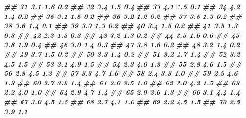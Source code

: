 \documentclass[
]{book}
\newenvironment{Shaded}{\begin{snugshade}}{\end{snugshade}}
\newcommand{\DocumentationTok}[1]{\textcolor[rgb]{0.56,0.35,0.01}{\textbf{\textit{#1}}}}
\begin{document}
\begin{Shaded}
\begin{Highlighting}[]
\DocumentationTok{\#\# 31          3.1          1.6         0.2}
\DocumentationTok{\#\# 32          3.4          1.5         0.4}
\DocumentationTok{\#\# 33          4.1          1.5         0.1}
\DocumentationTok{\#\# 34          4.2          1.4         0.2}
\DocumentationTok{\#\# 35          3.1          1.5         0.2}
\DocumentationTok{\#\# 36          3.2          1.2         0.2}
\DocumentationTok{\#\# 37          3.5          1.3         0.2}
\DocumentationTok{\#\# 38          3.6          1.4         0.1}
\DocumentationTok{\#\# 39          3.0          1.3         0.2}
\DocumentationTok{\#\# 40          3.4          1.5         0.2}
\DocumentationTok{\#\# 41          3.5          1.3         0.3}
\DocumentationTok{\#\# 42          2.3          1.3         0.3}
\DocumentationTok{\#\# 43          3.2          1.3         0.2}
\DocumentationTok{\#\# 44          3.5          1.6         0.6}
\DocumentationTok{\#\# 45          3.8          1.9         0.4}
\DocumentationTok{\#\# 46          3.0          1.4         0.3}
\DocumentationTok{\#\# 47          3.8          1.6         0.2}
\DocumentationTok{\#\# 48          3.2          1.4         0.2}
\DocumentationTok{\#\# 49          3.7          1.5         0.2}
\DocumentationTok{\#\# 50          3.3          1.4         0.2}
\DocumentationTok{\#\# 51          3.2          4.7         1.4}
\DocumentationTok{\#\# 52          3.2          4.5         1.5}
\DocumentationTok{\#\# 53          3.1          4.9         1.5}
\DocumentationTok{\#\# 54          2.3          4.0         1.3}
\DocumentationTok{\#\# 55          2.8          4.6         1.5}
\DocumentationTok{\#\# 56          2.8          4.5         1.3}
\DocumentationTok{\#\# 57          3.3          4.7         1.6}
\DocumentationTok{\#\# 58          2.4          3.3         1.0}
\DocumentationTok{\#\# 59          2.9          4.6         1.3}
\DocumentationTok{\#\# 60          2.7          3.9         1.4}
\DocumentationTok{\#\# 61          2.0          3.5         1.0}
\DocumentationTok{\#\# 62          3.0          4.2         1.5}
\DocumentationTok{\#\# 63          2.2          4.0         1.0}
\DocumentationTok{\#\# 64          2.9          4.7         1.4}
\DocumentationTok{\#\# 65          2.9          3.6         1.3}
\DocumentationTok{\#\# 66          3.1          4.4         1.4}
\DocumentationTok{\#\# 67          3.0          4.5         1.5}
\DocumentationTok{\#\# 68          2.7          4.1         1.0}
\DocumentationTok{\#\# 69          2.2          4.5         1.5}
\DocumentationTok{\#\# 70          2.5          3.9         1.1}

\end{Highlighting}
\end{Shaded}
\end{document}
